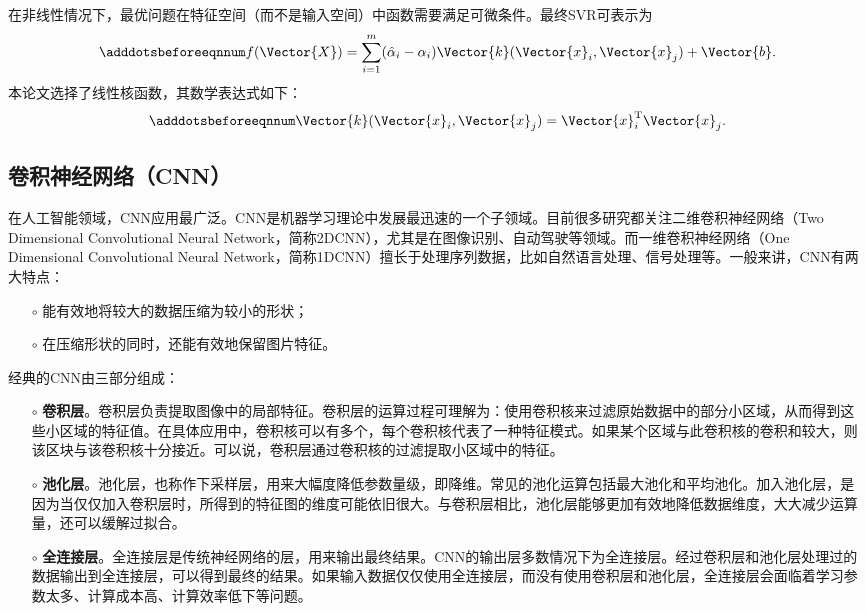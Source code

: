 在非线性情况下，最优问题在特征空间（而不是输入空间）中函数需要满足可微条件。最终SVR可表示为
\begin{equation}\adddotsbeforeeqnnum
  \label{eq:ml_svr_kernel_v2}
  f(\Vector{X})=\sum_{i=1}^{m}(\hat{\alpha}_i-\alpha_i)\Vector{k}(\Vector{x}_i,\Vector{x}_j)+\Vector{b}.
\end{equation}
本论文选择了线性核函数，其数学表达式如下：
\begin{equation}\adddotsbeforeeqnnum
  \label{eq:ml_svr_kernel_linear}
  \Vector{k}(\Vector{x}_i,\Vector{x}_j)=\Vector{x}_i^{\text{T}}\Vector{x}_j.
\end{equation}

\subsection{卷积神经网络（CNN）}\label{sec:ml_cnn}

在人工智能领域，CNN应用最广泛。CNN是机器学习理论中发展最迅速的一个子领域。目前很多研究都关注二维卷积神经网络（Two Dimensional Convolutional Neural Network，简称2DCNN），尤其是在图像识别、自动驾驶等领域。而一维卷积神经网络（One Dimensional Convolutional Neural Network，简称1DCNN）擅长于处理序列数据，比如自然语言处理、信号处理等。一般来讲，CNN有两大特点：
\begin{itemize}
  \item[$\circ$] 能有效地将较大的数据压缩为较小的形状；
  \item[$\circ$] 在压缩形状的同时，还能有效地保留图片特征。
\end{itemize}

经典的CNN由三部分组成：
\begin{itemize}
  \item[$\circ$] \textbf{卷积层}。卷积层负责提取图像中的局部特征。卷积层的运算过程可理解为：使用卷积核来过滤原始数据中的部分小区域，从而得到这些小区域的特征值。在具体应用中，卷积核可以有多个，每个卷积核代表了一种特征模式。如果某个区域与此卷积核的卷积和较大，则该区块与该卷积核十分接近。可以说，卷积层通过卷积核的过滤提取小区域中的特征。
  \item[$\circ$] \textbf{池化层}。池化层，也称作下采样层，用来大幅度降低参数量级，即降维。常见的池化运算包括最大池化和平均池化。加入池化层，是因为当仅仅加入卷积层时，所得到的特征图的维度可能依旧很大。与卷积层相比，池化层能够更加有效地降低数据维度，大大减少运算量，还可以缓解过拟合。
  \item[$\circ$] \textbf{全连接层}。全连接层是传统神经网络的层，用来输出最终结果。CNN的输出层多数情况下为全连接层。经过卷积层和池化层处理过的数据输出到全连接层，可以得到最终的结果。如果输入数据仅仅使用全连接层，而没有使用卷积层和池化层，全连接层会面临着学习参数太多、计算成本高、计算效率低下等问题。
\end{itemize}

